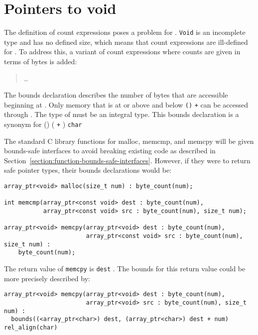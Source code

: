 \section{Pointers to void}
\label{section:pointers-to-void}

The definition of count expressions poses a problem for
\arrayptrvoid. \texttt{Void} is an
incomplete type and has no defined size, which means that count
expressions are ill-defined for
\arrayptrvoid. To address this, a
variant of count expressions where counts are given in terms of bytes is
added:


\begin{quote}
\ldots{}

\end{quote}

The bounds declaration 
describes the number of bytes that are accessible beginning at . 
Only memory that is at or above  and below \texttt{(\arrayptrchar)}
 \texttt{+}  can be accessed through . The type
of  must be an integral type. This bounds declaration is a synonym for 
           {
                      {(\arrayptrchar) ( \texttt{+} )}
                      {\texttt{char}}}

The standard C library functions for malloc, memcmp, and memcpy will be
given bounds-safe interfaces to avoid breaking existing code as
described in Section~\ref{section:function-bounds-safe-interfaces}. 
However, if they were to return safe pointer
types, their bounds declarations would be:

\begin{verbatim}
array_ptr<void> malloc(size_t num) : byte_count(num);

int memcmp(array_ptr<const void> dest : byte_count(num),
           array_ptr<const void> src : byte_count(num), size_t num);

array_ptr<void> memcpy(array_ptr<void> dest : byte_count(num),
                       array_ptr<const void> src : byte_count(num), size_t num) :
    byte_count(num);
\end{verbatim}

The return value of \texttt{memcpy} is \texttt{dest} . The bounds for
this return value could be more precisely described by:

\begin{verbatim}
array_ptr<void> memcpy(array_ptr<void> dest : byte_count(num),
                       array_ptr<void> src : byte_count(num), size_t num) :
  bounds((<array_ptr<char>) dest, (array_ptr<char>) dest + num) rel_align(char)
\end{verbatim}

